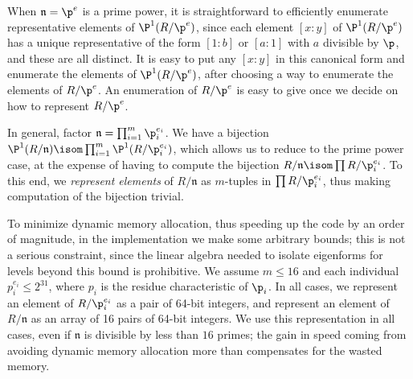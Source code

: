 \documentclass{amsart}
\newcommand{\n}{\mathfrak{n}}
\begin{document}
When $\n=\p^e$ is a prime power, it is
straightforward to efficiently enumerate representative elements of
$\P^1(R/\p^e)$, since each element $[x:y]$ of $\P^1(R/\p^e)$ has a
unique representative of the form $[1:b]$ or $[a:1]$ with $a$
divisible by $\p$, and these are all distinct.  It is easy 
to put  any $[x:y]$ 
in this canonical form and enumerate the elements of $\P^1(R/\p^e)$, after
choosing a way to enumerate the elements of $R/\p^e$.
An enumeration of $R/\p^e$ is easy to give
once we decide on how to represent $R/\p^e$.

In general, factor $\n = \prod_{i=1}^m \p_i^{e_i}$. 
We have a bijection $\P^1(R/\n) \isom \prod_{i=1}^m
\P^1(R/\p_i^{e_i})$, which allows us to reduce to the prime power
case, at the expense of having to compute the bijection 
$R/\n \isom \prod R/\p_i^{e_i}$.
To this end, we {\em represent elements} of $R/\n$ as
$m$-tuples in $\prod R/\p_i^{e_i}$, thus making
computation of the bijection trivial.  

To minimize dynamic memory allocation, thus speeding up the
code by an order of magnitude, in the implementation
we make some arbitrary
bounds; this is not a serious constraint, since the linear algebra
needed to isolate eigenforms for levels beyond this bound is
prohibitive. We assume $m\leq 16$ and each individual 
$p_i^{e_i}\leq 2^{31}$, where $p_i$ is the residue characteristic of $\p_i$.  
In all cases, we represent an
element of $R/\p_i^{e_i}$ as a pair of  64-bit integers, and
represent an element of $R/\n$ as an array of 16 pairs of 64-bit
integers. We use this representation in all cases, even if $\n$ is
divisible by less than $16$ primes; the gain in speed coming
from avoiding dynamic memory allocation more than compensates for the
wasted memory.
\end{document}
